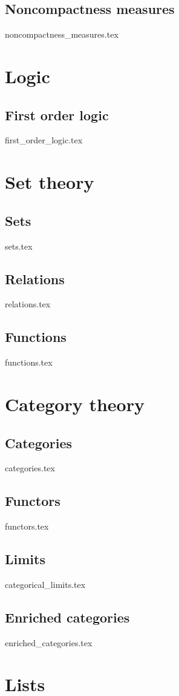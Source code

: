 \documentclass[numbers=endperiod, bibliography=totocnumbered]{scrartcl}
\begin{document}
\subsection{Noncompactness measures}\label{sec:noncompactness_measures}
{noncompactness_measures.tex}

\section{Logic}\label{sec:logic}
\subsection{First order logic}\label{sec:first_order_logic}
{first_order_logic.tex}

\section{Set theory}\label{sec:set_theory}
\subsection{Sets}\label{sec:sets}
{sets.tex}
\subsection{Relations}\label{sec:relations}
{relations.tex}
\subsection{Functions}\label{sec:functions}
{functions.tex}

\section{Category theory}\label{sec:category_theory}
\subsection{Categories}\label{sec:categories}
{categories.tex}
\subsection{Functors}\label{sec:functors}
{functors.tex}
\subsection{Limits}\label{sec:categorical_limits}
{categorical_limits.tex}
\subsection{Enriched categories}\label{sec:enriched_categories}
{enriched_categories.tex}

\section{Lists}

\listofaoc\label{list:aoc}
\listoflem\label{list:lem}
\listofusc\label{list:usc}

\printbibliography
\end{document}
